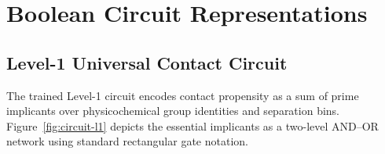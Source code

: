 \section{Boolean Circuit Representations}
\label{sec:circuit-diagrams}

\subsection{Level-1 Universal Contact Circuit}

The trained Level-1 circuit encodes contact propensity as a sum of prime
implicants over physicochemical group identities and separation bins.
Figure~\ref{fig:circuit-l1} depicts the essential implicants as a two-level
AND--OR network using standard rectangular gate notation.

